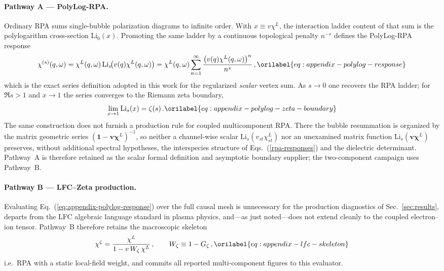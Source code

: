 \documentclass[aps,showkeys,noshowpacs,superscriptaddress,pre,preprint]{revtex4-2}
\let\label\orilabel
\begin{document}
\paragraph{Pathway A --- PolyLog-RPA.}
Ordinary RPA sums single-bubble polarization diagrams to infinite order. With $x\equiv v\chi^L$, the interaction ladder content of that sum is the polylogarithm cross-section $\mathrm{Li}_0(x)$. Promoting the same ladder by a continuous topological penalty $n^{-s}$ defines the PolyLog-RPA response
\begin{equation}
\chi^{(s)}(q,\omega)
=
\chi^L(q,\omega)\,
\mathrm{Li}_s\!\bigl(v(q)\chi^L(q,\omega)\bigr)
=
\chi^L(q,\omega)
\sum_{n=1}^{\infty}
\frac{\bigl(v(q)\chi^L(q,\omega)\bigr)^n}{n^s}\,,
\label{eq:appendix-polylog-response}
\end{equation}
which is the exact series definition adopted in this work for the regularized \emph{scalar} vertex sum.
As $s\to 0$ one recovers the RPA ladder; for $\Re s>1$ and $x\to 1$ the series converges to the Riemann zeta boundary,
\begin{equation}
\lim_{x\to 1}\mathrm{Li}_s(x)=\zeta(s)\,.
\label{eq:appendix-polylog-zeta-boundary}
\end{equation}
The same construction does not furnish a production rule for coupled multicomponent RPA.
There the bubble resummation is organized by the matrix geometric series
$(\mathbf{1}-\mathbf{v}\boldsymbol{\chi}^{L})^{-1}$,
so neither a channel-wise scalar $\mathrm{Li}_s(v_{st}\chi_{st}^{L})$ nor an unexamined matrix function $\mathrm{Li}_s(\mathbf{v}\boldsymbol{\chi}^{L})$ preserves, without additional spectral hypotheses, the interspecies structure of Eqs.~(\ref{rpa-responses}) and the dielectric determinant.
Pathway~A is therefore retained as the scalar formal definition and asymptotic boundary supplier; the two-component campaign uses Pathway~B.

\paragraph{Pathway B --- LFC--Zeta production.}
Evaluating Eq.~(\ref{eq:appendix-polylog-response}) over the full causal mesh is unnecessary for the production diagnostics of Sec.~\ref{sec:results}, departs from the LFC algebraic language standard in plasma physics, and---as just noted---does not extend cleanly to the coupled electron--ion tensor.
Pathway~B therefore retains the macroscopic skeleton
\begin{equation}
\chi^{\zeta}
=
\frac{\chi^L}{1-v\,W_\zeta\,\chi^L}\,,
\qquad
W_\zeta\equiv 1-G_\zeta\,,
\label{eq:appendix-lfc-skeleton}
\end{equation}
i.e.\ RPA with a static local-field weight, and commits all reported multi-component figures to this evaluator.
\end{document}
